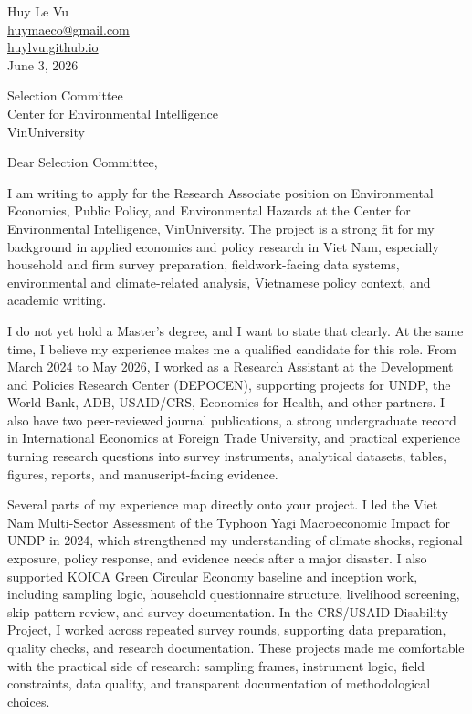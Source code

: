 \documentclass[10pt]{article}
\begin{document}
\begin{flushright}
Huy Le Vu\\
\href{mailto:huymaeco@gmail.com}{huymaeco@gmail.com}\\
\href{https://huylvu.github.io}{huylvu.github.io}\\
June 3, 2026
\end{flushright}

Selection Committee\\
Center for Environmental Intelligence\\
VinUniversity

Dear Selection Committee,

I am writing to apply for the Research Associate position on Environmental Economics, Public Policy, and Environmental Hazards at the Center for Environmental Intelligence, VinUniversity. The project is a strong fit for my background in applied economics and policy research in Viet Nam, especially household and firm survey preparation, fieldwork-facing data systems, environmental and climate-related analysis, Vietnamese policy context, and academic writing.

I do not yet hold a Master's degree, and I want to state that clearly. At the same time, I believe my experience makes me a qualified candidate for this role. From March 2024 to May 2026, I worked as a Research Assistant at the Development and Policies Research Center (DEPOCEN), supporting projects for UNDP, the World Bank, ADB, USAID/CRS, Economics for Health, and other partners. I also have two peer-reviewed journal publications, a strong undergraduate record in International Economics at Foreign Trade University, and practical experience turning research questions into survey instruments, analytical datasets, tables, figures, reports, and manuscript-facing evidence.

Several parts of my experience map directly onto your project. I led the Viet Nam Multi-Sector Assessment of the Typhoon Yagi Macroeconomic Impact for UNDP in 2024, which strengthened my understanding of climate shocks, regional exposure, policy response, and evidence needs after a major disaster. I also supported KOICA Green Circular Economy baseline and inception work, including sampling logic, household questionnaire structure, livelihood screening, skip-pattern review, and survey documentation. In the CRS/USAID Disability Project, I worked across repeated survey rounds, supporting data preparation, quality checks, and research documentation. These projects made me comfortable with the practical side of research: sampling frames, instrument logic, field constraints, data quality, and transparent documentation of methodological choices.
\end{document}
